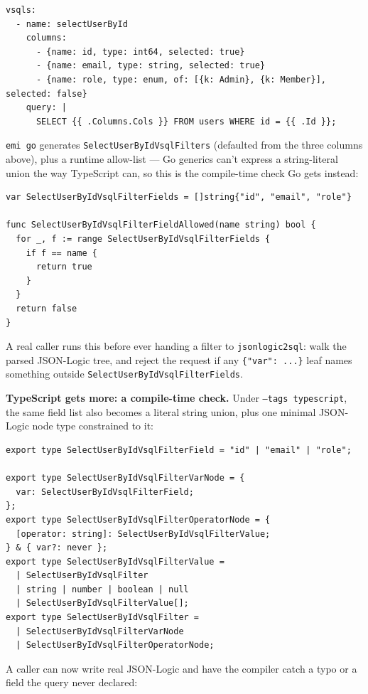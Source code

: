 \begin{lstlisting}
vsqls:
  - name: selectUserById
    columns:
      - {name: id, type: int64, selected: true}
      - {name: email, type: string, selected: true}
      - {name: role, type: enum, of: [{k: Admin}, {k: Member}], selected: false}
    query: |
      SELECT {{ .Columns.Cols }} FROM users WHERE id = {{ .Id }};
\end{lstlisting}

\texttt{emi go} generates \texttt{SelectUserByIdVsqlFilters} (defaulted
from the three columns above), plus a runtime allow-list --- Go
generics can't express a string-literal union the way TypeScript can,
so this is the compile-time check Go gets instead:

\begin{lstlisting}
var SelectUserByIdVsqlFilterFields = []string{"id", "email", "role"}

func SelectUserByIdVsqlFilterFieldAllowed(name string) bool {
  for _, f := range SelectUserByIdVsqlFilterFields {
    if f == name {
      return true
    }
  }
  return false
}
\end{lstlisting}

A real caller runs this before ever handing a filter to
\texttt{jsonlogic2sql}: walk the parsed JSON-Logic tree, and reject the
request if any \texttt{\{"var": ...\}} leaf names something outside
\texttt{SelectUserByIdVsqlFilterFields}.

\textbf{TypeScript gets more: a compile-time check.} Under
\texttt{--tags typescript}, the same field list also becomes a
literal string union, plus one minimal JSON-Logic node type
constrained to it:

\begin{lstlisting}
export type SelectUserByIdVsqlFilterField = "id" | "email" | "role";

export type SelectUserByIdVsqlFilterVarNode = {
  var: SelectUserByIdVsqlFilterField;
};
export type SelectUserByIdVsqlFilterOperatorNode = {
  [operator: string]: SelectUserByIdVsqlFilterValue;
} & { var?: never };
export type SelectUserByIdVsqlFilterValue =
  | SelectUserByIdVsqlFilter
  | string | number | boolean | null
  | SelectUserByIdVsqlFilterValue[];
export type SelectUserByIdVsqlFilter =
  | SelectUserByIdVsqlFilterVarNode
  | SelectUserByIdVsqlFilterOperatorNode;
\end{lstlisting}

A caller can now write real JSON-Logic and have the compiler catch a
typo or a field the query never declared:

